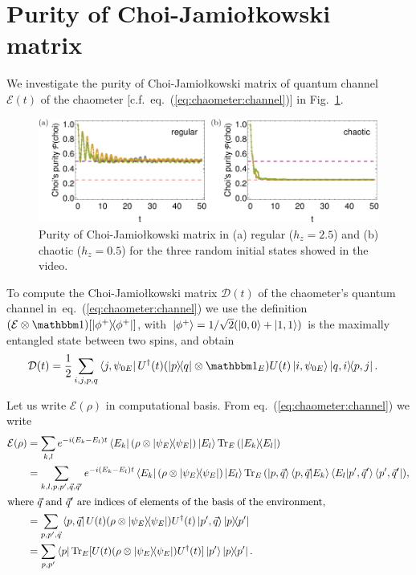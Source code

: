 \documentclass[10pt,letterpaper]{article}
\newcommand{\eref}[1]{eq.~(\ref{#1})}
\newcommand{\Fref}[1]{Fig.~\ref{#1}}
\newcommand{\mcE}{\mathcal E}
\newcommand{\mcD}{\mathcal D}
\newcommand{\jami}{Jamiołkowski}
\begin{document}
\section{Purity of Choi-\jami{} matrix}
We investigate the purity of Choi-\jami{} matrix of quantum channel $\mcE(t)$ 
of the chaometer [c.f.~\eref{eq:chaometer:channel}] in \Fref{fig:choi:purity}.
\begin{figure}
\centering
\includegraphics[width=\textwidth]{choi_purity.pdf}
\caption{Purity of Choi-\jami{} matrix in (a) regular ($h_z=2.5$) and (b) chaotic ($h_z=0.5$) for the three random initial states showed in the video.}
\label{fig:choi:purity}
\end{figure}

To compute the Choi-\jami{} matrix $\mcD(t)$ of the chaometer's quantum channel 
in~\eref{eq:chaometer:channel} we use the definition 
$\qty(\mcE \otimes \one) \qty[\dyad{\phi^+}]$, with $\ket{\phi^+}=1/\sqrt{2}\qty(\ket{0,0} + \ket{1,1})$
is the maximally entangled state between two spins, and obtain
\begin{align}\label{eq:choi:chaometer}
\mcD(t) &= 
\frac{1}{2}
\sum_{i,j,p,q}
\bra{j, \psi_{0E}} U^\dagger(t) \qty( \dyad{p}{q}\otimes \one_E ) U(t)
\ket{i, \psi_{0E}} \dyad{q,i}{p,j}.
\end{align}

Let us write $\mcE(\rho)$ in computational basis. From \eref{eq:chaometer:channel}
we write
\begin{align}
\mcE(\rho) &= 
\sum_{k,l} 
e^{-i (E_k - E_l)t}
\bra{E_k}  \qty(\rho \otimes \dyad{\psi_{E}}) \ket{E_l} \Tr_E \qty(\dyad{E_k}{E_l})\\
&= 
\sum_{k,l, p, p', \vec q, \vec q'}
e^{-i (E_k - E_l)t}
\bra{E_k} 
\qty(\rho \otimes \dyad{\psi_{E}}) 
\ket{E_l} 
\Tr_E \qty( \ket{p,\vec q} \braket{p,\vec q}{E_k} 
\braket{E_l}{p', \vec q'} \bra{p', \vec q'}), \\
\intertext{where $\vec q$ and $\vec q'$ are indices of elements of the 
basis of the environment,}
&= 
\sum_{p, p', \vec q}
\bra{p, \vec q}
U(t) \qty(\rho \otimes \dyad{\psi_{E}}) U^\dagger(t)
\ket{p', \vec q}
\dyad{p}{p'} \\
&= \label{eq:chaometer:channel:2}
\sum_{p, p'}
\bra{p}
\Tr_E[U(t) \qty(\rho \otimes \dyad{\psi_{E}}) U^\dagger(t) ]
\ket{p'}
\dyad{p}{p'}.
\end{align}
\end{document}
